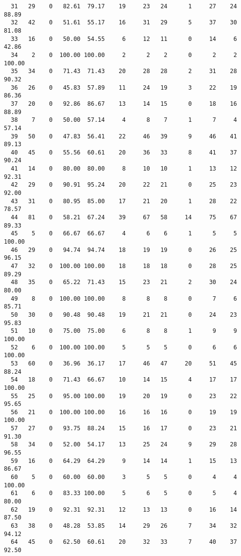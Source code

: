 \begin{verbatim}
  31   29    0   82.61  79.17    19     23   24      1     27    24    88.89
  32   42    0   51.61  55.17    16     31   29      5     37    30    81.08
  33   16    0   50.00  54.55     6     12   11      0     14     6    42.86
  34    2    0  100.00 100.00     2      2    2      0      2     2   100.00
  35   34    0   71.43  71.43    20     28   28      2     31    28    90.32
  36   26    0   45.83  57.89    11     24   19      3     22    19    86.36
  37   20    0   92.86  86.67    13     14   15      0     18    16    88.89
  38    7    0   50.00  57.14     4      8    7      1      7     4    57.14
  39   50    0   47.83  56.41    22     46   39      9     46    41    89.13
  40   45    0   55.56  60.61    20     36   33      8     41    37    90.24
  41   14    0   80.00  80.00     8     10   10      1     13    12    92.31
  42   29    0   90.91  95.24    20     22   21      0     25    23    92.00
  43   31    0   80.95  85.00    17     21   20      1     28    22    78.57
  44   81    0   58.21  67.24    39     67   58     14     75    67    89.33
  45    5    0   66.67  66.67     4      6    6      1      5     5   100.00
  46   29    0   94.74  94.74    18     19   19      0     26    25    96.15
  47   32    0  100.00 100.00    18     18   18      0     28    25    89.29
  48   35    0   65.22  71.43    15     23   21      2     30    24    80.00
  49    8    0  100.00 100.00     8      8    8      0      7     6    85.71
  50   30    0   90.48  90.48    19     21   21      0     24    23    95.83
  51   10    0   75.00  75.00     6      8    8      1      9     9   100.00
  52    6    0  100.00 100.00     5      5    5      0      6     6   100.00
  53   60    0   36.96  36.17    17     46   47     20     51    45    88.24
  54   18    0   71.43  66.67    10     14   15      4     17    17   100.00
  55   25    0   95.00 100.00    19     20   19      0     23    22    95.65
  56   21    0  100.00 100.00    16     16   16      0     19    19   100.00
  57   27    0   93.75  88.24    15     16   17      0     23    21    91.30
  58   34    0   52.00  54.17    13     25   24      9     29    28    96.55
  59   16    0   64.29  64.29     9     14   14      1     15    13    86.67
  60    5    0   60.00  60.00     3      5    5      0      4     4   100.00
  61    6    0   83.33 100.00     5      6    5      0      5     4    80.00
  62   19    0   92.31  92.31    12     13   13      0     16    14    87.50
  63   38    0   48.28  53.85    14     29   26      7     34    32    94.12
  64   45    0   62.50  60.61    20     32   33      7     40    37    92.50

\end{verbatim}
